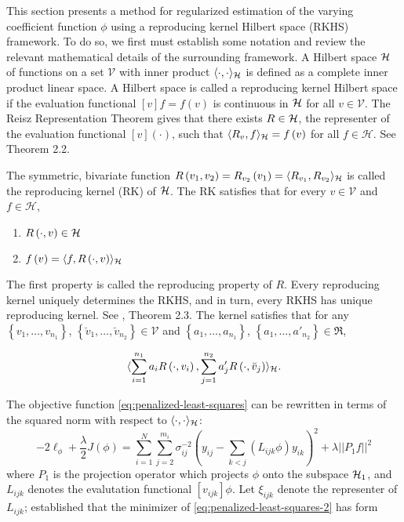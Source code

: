 This section presents a method for regularized estimation of the varying coefficient function $\phi$ using a reproducing kernel Hilbert space (RKHS) framework. To do so, we first must establish some notation and review the relevant mathematical details of the surrounding framework. A Hilbert space $\mathcal{H}$ of functions on a set $\mathcal{V}$ with inner product $\langle \cdot, \cdot\rangle_{\mathcal{H}}$ is defined as a complete inner product linear space. A Hilbert space is called a reproducing kernel Hilbert space if the evaluation functional $\left[v\right]f = f\left(v\right)$ is continuous in $\mathcal{H}$ for all $v \in \mathcal{V}$. The Reisz Representation Theorem gives that there exists $R \in \mathcal{H}$, the representer of the evaluation functional $\left[v\right]\left(\cdot\right)$, such that $\langle R_v, f \rangle_{\mathcal{H}} = f\left(v\right)$ for all $f \in \mathcal{H}$. See \citet{gu2013smoothing} Theorem 2.2.

\bigskip

The symmetric, bivariate function $R\left(v_1, v_2 \right) = R_{v_2 }\left(v_1\right) = \langle R_{v_1}, R_{v_2} \rangle_{\mathcal{H}}$ is called the reproducing kernel (RK) of $\mathcal{H}$. The RK satisfies that for every $v \in \mathcal{V}$ and $f \in \mathcal{H}$,

\begin{enumerate}
\item $R\left(\cdot, v \right) \in \mathcal{H}$ 
\item $f\left(v\right) = \langle f, R\left(\cdot, v\right)\rangle_{\mathcal{H}}$\label{rkhs-reproducing-property}
\end{enumerate}
\noindent
The first property is called the reproducing property of $R$. Every reproducing kernel uniquely determines the RKHS, and in turn, every RKHS has unique reproducing kernel. See \citet{gu2013smoothing}, Theorem 2.3. The kernel satisfies that for any $\left\{v_1,\dots, v_{n_1}\right\}$, $\left\{\breve{v}_1,\dots, \breve{v}_{n_2}\right\} \in \mathcal{V}$ and $\left\{a_1,\dots, a_{n_1}\right\}$, $\left\{a_1,\dots, a'_{n_2}\right\} \in \Re$,

\begin{equation}
 \langle\sum_{i = 1}^{n_1} a_i R\left(\cdot, v_i\right), \sum_{j = 1}^{n_2} a'_j R\left(\cdot, \breve{v}_j\right) \rangle_{\mathcal{H}}.
\end{equation}

The objective function \ref{eq:penalized-least-squares} can be rewritten in terms of the squared norm with respect to $\langle\cdot,\cdot\rangle_{\mathcal{H}}$:
\begin{equation} \label{eq:penalized-least-squares-2}
-2\ell_\phi + \frac{\lambda}{2} J\left(\phi\right) = \sum_{i=1}^N \sum_{j=2}^{m_i} \sigma^{-2}_{ij}\left( y_{ij} - \sum_{k<j}\left( L_{ijk}\phi\right) y_{ik}  \right)^2 + \lambda \vert\vert P_1 f \vert \vert^2
\end{equation}
\noindent
where $P_1$ is the projection operator which projects $\phi$ onto the subspace $\mathcal{H}_1$, and $L_{ijk}$ denotes the evalutation functional $\left[v_{ijk}\right] \phi$. Let $\xi_{ijk}$ denote the representer of $L_{ijk}$; \citet{kimeldorf1971some} established that the minimizer of \ref{eq:penalized-least-squares-2} has form

